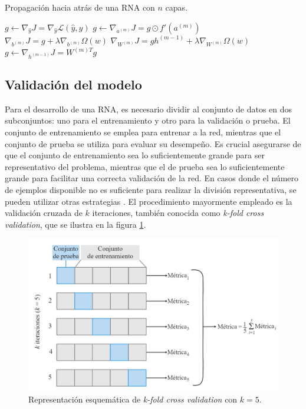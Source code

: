 \begin{algorithm}[H]
	\caption{Propagación hacia atrás de una RNA con $n$ capas.}
	\label{alg:backpropagation}
		\begin{algorithmic}
		\State $g \gets \nabla_{\hat{y}} J = \nabla_{\hat{y}} \mathcal{L}(\hat{y}, y)$ 
		\State $g \gets \nabla_{a^{(m)}} J = g \odot f'(a^{(m)})$ 
		\State $\nabla_{b^{(m)}} J = g + \lambda \nabla_{b^{(m)}} \Omega(w)$ 
		\State $\nabla_{W^{(m)}} J = g h^{(m-1)} + \lambda \nabla_{W^{(m)}} \Omega(w)$ 
		\State $g \gets \nabla_{h^{(m-1)}} J = W^{(m)T}g$ 
		\EndFor
	\end{algorithmic}
\end{algorithm}
\subsection{Validación del modelo}
Para el desarrollo de una RNA, es necesario dividir al conjunto de datos en dos subconjuntos: uno para el 
entrenamiento y otro para la validación o prueba. El conjunto de entrenamiento se emplea para entrenar a 
la red, mientras que el conjunto de prueba se utiliza para evaluar su desempeño. Es crucial asegurarse de 
que el conjunto de entrenamiento sea lo suficientemente grande para ser representativo del problema, mientras 
que el de prueba sea lo suficientemente grande para facilitar una correcta validación de la red. En casos 
donde el número de ejemplos disponible no es suficiente para realizar la división representativa, se 
pueden utilizar otras estrategias \citep{CITE:42}. 
El procedimiento mayormente empleado es la validación cruzada de $k$ 
iteraciones, también conocida como \emph{k-fold cross validation}, que se ilustra en la figura \ref{fig:crossval}. 

\begin{figure}[h!]
	\centering
	\includegraphics[width=\textwidth]{./Figures/cross_validation.jpg}
	\caption{Representación esquemática de \emph{k-fold cross validation} con $k=5$\protect\footnotemark.}
	\label{fig:crossval}
\end{figure}


